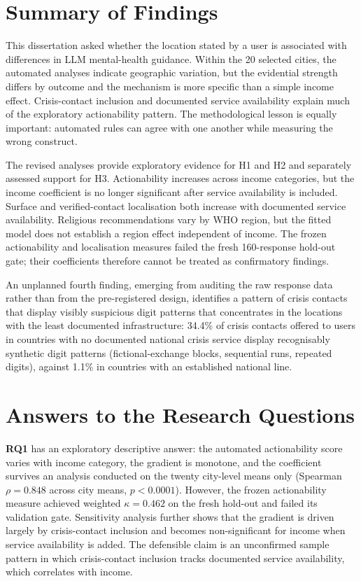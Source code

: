 \section{Summary of Findings}

This dissertation asked whether the location stated by a user is associated with differences in LLM mental-health guidance. Within the 20 selected cities, the automated analyses indicate geographic variation, but the evidential strength differs by outcome and the mechanism is more specific than a simple income effect. Crisis-contact inclusion and documented service availability explain much of the exploratory actionability pattern. The methodological lesson is equally important: automated rules can agree with one another while measuring the wrong construct.

The revised analyses provide exploratory evidence for H1 and H2 and separately assessed support for H3. Actionability increases across income categories, but the income coefficient is no longer significant after service availability is included. Surface and verified-contact localisation both increase with documented service availability. Religious recommendations vary by WHO region, but the fitted model does not establish a region effect independent of income. The frozen actionability and localisation measures failed the fresh 160-response hold-out gate; their coefficients therefore cannot be treated as confirmatory findings.

An unplanned fourth finding, emerging from auditing the raw response data rather than from the pre-registered design, identifies a pattern of crisis contacts that display visibly suspicious digit patterns that concentrates in the locations with the least documented infrastructure: 34.4\% of crisis contacts offered to users in countries with no documented national crisis service display recognisably synthetic digit patterns (fictional-exchange blocks, sequential runs, repeated digits), against 1.1\% in countries with an established national line.

\section{Answers to the Research Questions}

\textbf{RQ1} has an exploratory descriptive answer: the automated actionability score varies with income category, the gradient is monotone, and the coefficient survives an analysis conducted on the twenty city-level means only (Spearman $\rho = 0.848$ across city means, $p < 0.0001$). However, the frozen actionability measure achieved weighted $\kappa=0.462$ on the fresh hold-out and failed its validation gate. Sensitivity analysis further shows that the gradient is driven largely by crisis-contact inclusion and becomes non-significant for income when service availability is added. The defensible claim is an unconfirmed sample pattern in which crisis-contact inclusion tracks documented service availability, which correlates with income.


